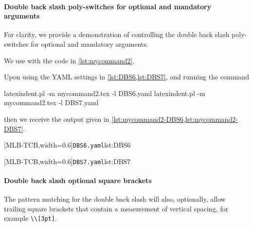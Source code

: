  \paragraph{Double back slash poly-switches for optional and mandatory arguments}
  For clarity, we provide a demonstration of controlling the double back slash
  poly-switches for optional and mandatory arguments.

  \begin{example}
  We use with the code in \cref{lst:mycommand2}. 


  Upon using the YAML settings in \cref{lst:DBS6,lst:DBS7}, and running the command
   

  \begin{commandshell}
latexindent.pl -m mycommand2.tex -l DBS6.yaml
latexindent.pl -m mycommand2.tex -l DBS7.yaml
\end{commandshell}

  then we receive the output given in \cref{lst:mycommand2-DBS6,lst:mycommand2-DBS7}.

  \begin{cmhtcbraster}[
    raster force size=false,
    raster column 1/.style={add to width=-.1\textwidth},
    raster column skip=.03\linewidth]
   [MLB-TCB,width=0.6\textwidth]{\texttt{DBS6.yaml}}{lst:DBS6}
  \end{cmhtcbraster}

  \begin{cmhtcbraster}[
    raster force size=false,
    raster column 1/.style={add to width=-.1\textwidth},
    raster column skip=.03\linewidth]
   [MLB-TCB,width=0.6\textwidth]{\texttt{DBS7.yaml}}{lst:DBS7}
  \end{cmhtcbraster}
  \end{example}

 \paragraph{Double back slash optional square brackets}
  The pattern matching for the double back slash will also, optionally, allow trailing
  square brackets that contain a measurement of vertical spacing, for example
  \lstinline!\\[3pt]!. 

